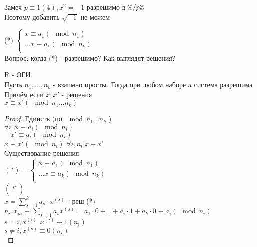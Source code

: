 Замеч $ p \equiv 1 (4), x^2 = -1 $ разрешимо в $ \mathbb{Z} / p\mathbb{Z} $ \\
Поэтому добавить $ \sqrt{-1} $ не можем \\


(*) $ \left\{\begin{array}{cc}
x \equiv a_1 (\mod n_1) \\
...
x \equiv a_k (\mod n_k) \\
\end{array}  \right. $ \\
Вопрос: когда (*) - разрешимо? Как выглядят решения? \\
\begin{theorem}
	R - ОГИ \\
	Пусть $ n_1, ..., n_k $ - взаимно просты. Тогда при любом наборе a система разрешима \\
	Причём если $ x, x' $ - решения \\
	$ x \equiv x'(\mod n_1...n_k) $ 
	\begin{proof}
		Единств (по $\mod n_1...n_k$ ) \\
		$ \forall i \ \ x \equiv a_i (\mod n_i) $ \\
		$ \ \ \ \ x' \equiv a_i (\mod n_i) $ \\
		$ x \equiv x' (\mod n_i) $ 
		$ \forall i, n_i | x - x' $ \\
		Существование решения \\
		$(*) =  \left\{\begin{array}{cc}
		x \equiv a_1 (\mod n_1) \\
		...
		x \equiv a_k (\mod n_k) \\
		\end{array}  \right. $ \\
		$(*^i) $ \\
		$ x = \sum_{s = 1}^{k} a_s \cdot x^{(s)} $ - реш (*) \\
		$ n_i \ \ x_{n_i} \equiv \sum_{s = 1}a_s x^{(s)} = a_1 \cdot 0 + .. + a_i \cdot 1 + a_k \cdot 0 \equiv a_i (\mod n_i)$ \\
		$ s = i, x^{(i)}  \ \ x^{(i)} \equiv 1 (n_i) $ \\
		$ s \neq i, x^{(s)} \equiv 0(n_i) $ \\
 	\end{proof}
\end{theorem}






